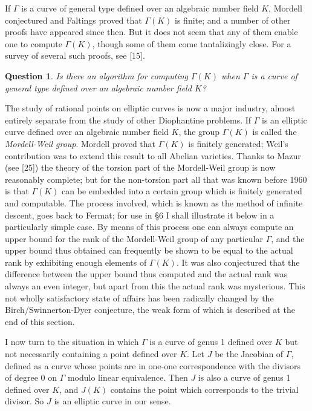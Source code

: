 \documentclass[12pt]{article}
\def\gG{{\Gamma}}
\def\bpr{\begin{question} \label}
\def\epr{\end{question}}
\newtheorem{question}{Question}
\begin{document}
\medskip

If $\gG$ is a curve of general type defined over an algebraic number field $K$,
Mordell conjectured and Faltings proved that $\gG(K)$ is finite; and a number
of other proofs have appeared since then. But it does not seem that any of them
enable one to compute $\gG(K)$, though some of them come tantalizingly close.
For a survey of several such proofs, see [15].
\bpr{Q10} Is there an algorithm for computing $\gG(K)$ when $\gG$ is a curve
of general type defined over an algebraic number field $K$?
\epr

\medskip

The study of rational points on elliptic curves is now a major industry,
almost entirely separate from the study of other Diophantine problems.
If $\gG$ is an elliptic curve defined over an algebraic number field $K$,
the group $\gG(K)$ is called the \emph{Mordell-Weil group}. Mordell proved that
$\gG(K)$ is finitely generated; Weil's contribution was to extend this result
to all Abelian varieties. Thanks to Mazur (see [25]) the theory of the torsion
part of the Mordell-Weil
group is now reasonably complete; but for the non-torsion part all that was
known before 1960 is that $\gG(K)$ can be embedded into a certain group
which is finitely generated and computable. The process involved, which is
known as the method of infinite descent, goes back to Fermat; for use in \S6
I shall illustrate it below in a particularly simple case. By means of this
process
one can always compute an upper bound for the rank of the Mordell-Weil group
of any particular $\gG$, and the upper bound thus obtained can frequently
be shown to be equal to the actual rank by exhibiting enough elements
of $\gG(K)$. It was also conjectured that
the difference between the upper bound thus computed and the actual rank was
always an even integer, but apart from this the actual rank was
mysterious. This not wholly satisfactory state of
affairs has been radically changed by the Birch/Swinnerton-Dyer conjecture,
the weak form of which is described at the end of this section.

I now turn to the situation in which $\gG$ is a curve of genus 1 defined over
$K$ but not necessarily containing a point defined over $K$. Let $J$ be the
Jacobian of $\gG$, defined as a curve whose points are in one-one
correspondence with the divisors of degree 0 on $\gG$ modulo linear
equivalence. Then $J$ is also a curve of genus 1 defined over $K$, and $J(K)$
contains the point which corresponds to the trivial divisor. So $J$ is an
elliptic curve in our sense.
\end{document}
